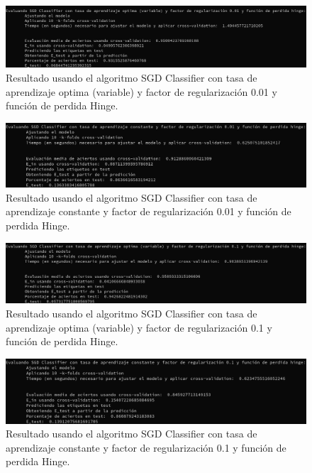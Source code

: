 \documentclass[12pt, spanish]{article}
\begin{document}
\begin{figure}[H]
	\centering
	\hspace*{-1cm}\includegraphics[scale=0.4]{clasificacion/sgdH001.png}
	\caption{Resultado usando el algoritmo SGD Classifier con tasa de aprendizaje optima (variable) y factor de regularización 0.01 y función de perdida Hinge.}
	\label{SGDL001}
\end{figure}

\begin{figure}[H]
	\centering
	\hspace*{-1cm}\includegraphics[scale=0.4]{clasificacion/sgdH001c.png}
	\caption{Resultado usando el algoritmo SGD Classifier con tasa de aprendizaje constante y factor de regularización 0.01 y función de perdida Hinge.}
	\label{SGDL001}
\end{figure}


\begin{figure}[H]
	\centering
	\hspace*{-1cm}\includegraphics[scale=0.4]{clasificacion/sgdH01.png}
	\caption{Resultado usando el algoritmo SGD Classifier con tasa de aprendizaje optima (variable) y factor de regularización 0.1 y función de perdida Hinge.}
	\label{SGDL001}
\end{figure}

\begin{figure}[H]
	\centering
	\hspace*{-1cm}\includegraphics[scale=0.4]{clasificacion/sgdH01c.png}
	\caption{Resultado usando el algoritmo SGD Classifier con tasa de aprendizaje constante y factor de regularización 0.1 y función de perdida Hinge.}
	\label{SGDL001}
\end{figure}
\end{document}
